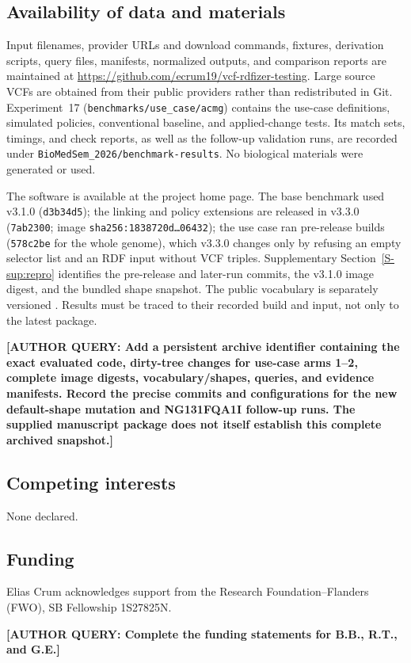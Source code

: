 \documentclass[pdflatex,sn-mathphys-num]{sn-jnl}
\newcommand{\authorquery}[1]{\par\smallskip\noindent\begin{minipage}{\linewidth}\color{queryorange}\textbf{[AUTHOR QUERY: #1]}\end{minipage}\par\smallskip}
\begin{document}
\subsection*{Availability of data and materials}
Input filenames, provider URLs and download commands, fixtures, derivation scripts, query files, manifests, normalized outputs, and comparison reports are maintained at \url{https://github.com/ecrum19/vcf-rdfizer-testing}. 
Large source VCFs are obtained from their public providers rather than redistributed in Git. 
Experiment~17 (\texttt{benchmarks/use\_case/acmg}) contains the use-case definitions, simulated policies, conventional baseline, and applied-change tests. 
Its match sets, timings, and check reports, as well as the follow-up validation runs, are recorded under \texttt{BioMedSem\_2026/benchmark-results}. 
No biological materials were generated or used.

The software is available at the project home page. 
The base benchmark used v3.1.0 (\texttt{d3b34d5}); the linking and policy extensions are released in v3.3.0 (\texttt{7ab2300}; image \texttt{sha256:1838720d\ldots06432}); the use case ran pre-release builds (\texttt{578c2be} for the whole genome), which v3.3.0 changes only by refusing an empty selector list and an RDF input without VCF triples. 
Supplementary Section~\ref{S-sup:repro} identifies the pre-release and later-run commits, the v3.1.0 image digest, and the bundled shape snapshot. 
The public vocabulary is separately versioned \cite{vcfc210}. 
Results must be traced to their recorded build and input, not only to the latest package.
\authorquery{Add a persistent archive identifier containing the exact evaluated code, dirty-tree changes for use-case arms 1--2, complete image digests, vocabulary/shapes, queries, and evidence manifests. Record the precise commits and configurations for the new default-shape mutation and NG131FQA1I follow-up runs. The supplied manuscript package does not itself establish this complete archived snapshot.}

\subsection*{Competing interests}
None declared.

\subsection*{Funding}
Elias Crum acknowledges support from the Research Foundation--Flanders (FWO), SB Fellowship 1S27825N.
\authorquery{Complete the funding statements for B.B., R.T., and G.E.}
\end{document}
